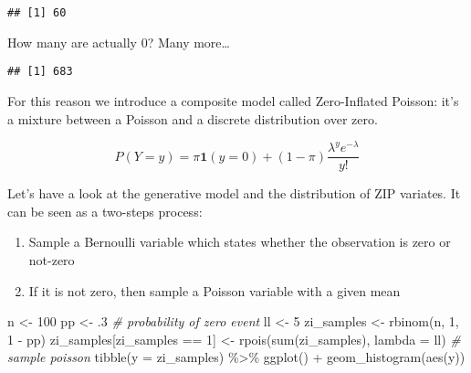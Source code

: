 \documentclass[
  oneside]{book}
\newenvironment{Shaded}{\begin{snugshade}}{\end{snugshade}}
\newcommand{\AttributeTok}[1]{\textcolor[rgb]{0.77,0.63,0.00}{#1}}
\newcommand{\CommentTok}[1]{\textcolor[rgb]{0.56,0.35,0.01}{\textit{#1}}}
\newcommand{\DecValTok}[1]{\textcolor[rgb]{0.00,0.00,0.81}{#1}}
\newcommand{\FunctionTok}[1]{\textcolor[rgb]{0.00,0.00,0.00}{#1}}
\newcommand{\NormalTok}[1]{#1}
\newcommand{\OtherTok}[1]{\textcolor[rgb]{0.56,0.35,0.01}{#1}}
\newcommand{\SpecialCharTok}[1]{\textcolor[rgb]{0.00,0.00,0.00}{#1}}
\providecommand{\tightlist}{%
  \setlength{\itemsep}{0pt}\setlength{\parskip}{0pt}}
\begin{document}
\begin{verbatim}
## [1] 60
\end{verbatim}

How many are actually 0? Many more\ldots{}

\begin{Shaded}
\end{Shaded}

\begin{verbatim}
## [1] 683
\end{verbatim}

For this reason we introduce a composite model called Zero-Inflated Poisson:
it's a mixture between a Poisson and a discrete distribution over zero.

\[
P(Y = y) = \pi \bm{1}(y = 0) + (1 - \pi) \frac{\lambda^{y} e^{-\lambda}}{y!}
\]

Let's have a look at the generative model and the distribution of ZIP variates.
It can be seen as a two-steps process:

\begin{enumerate}
\def\labelenumi{\arabic{enumi}.}
\tightlist
\item
  Sample a Bernoulli variable which states whether the observation is
  zero or not-zero
\item
  If it is not zero, then sample a Poisson variable with a given mean
\end{enumerate}

\begin{Shaded}
\begin{Highlighting}[]
\NormalTok{n }\OtherTok{\textless{}{-}} \DecValTok{100}
\NormalTok{pp }\OtherTok{\textless{}{-}}\NormalTok{ .}\DecValTok{3} \CommentTok{\# probability of zero event}
\NormalTok{ll }\OtherTok{\textless{}{-}} \DecValTok{5}
\NormalTok{zi\_samples }\OtherTok{\textless{}{-}} \FunctionTok{rbinom}\NormalTok{(n, }\DecValTok{1}\NormalTok{, }\DecValTok{1} \SpecialCharTok{{-}}\NormalTok{ pp)}
\NormalTok{zi\_samples[zi\_samples }\SpecialCharTok{==} \DecValTok{1}\NormalTok{] }\OtherTok{\textless{}{-}} \FunctionTok{rpois}\NormalTok{(}\FunctionTok{sum}\NormalTok{(zi\_samples), }\AttributeTok{lambda =}\NormalTok{ ll) }\CommentTok{\# sample poisson}
\FunctionTok{tibble}\NormalTok{(}\AttributeTok{y =}\NormalTok{ zi\_samples) }\SpecialCharTok{\%\textgreater{}\%}
  \FunctionTok{ggplot}\NormalTok{() }\SpecialCharTok{+}
  \FunctionTok{geom\_histogram}\NormalTok{(}\FunctionTok{aes}\NormalTok{(y))}
\end{Highlighting}
\end{Shaded}
\end{document}
